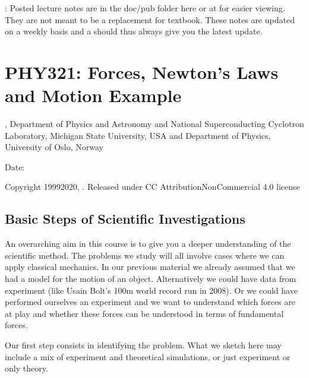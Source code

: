 \documentclass[letterpaper,10pt,english]{sphinxmanual}
\begin{document}
:
Posted lecture notes are in the doc/pub folder here or at  for easier viewing. They are not meant to be a replacement for textbook. These notes are updated on a weekly basis and a  should thus always give you the latest update.




\section{PHY321: Forces, Newton’s Laws and Motion Example}
\label{\detokenize{chapter2:phy321-forces-newton-s-laws-and-motion-example}}\label{\detokenize{chapter2::doc}}




, Department of Physics and Astronomy and National Superconducting Cyclotron Laboratory, Michigan State University, USA and Department of Physics, University of Oslo, Norway









Date: 

Copyright 1999\sphinxhyphen{}2020, . Released under CC Attribution\sphinxhyphen{}NonCommercial 4.0 license


\subsection{Basic Steps of Scientific Investigations}
\label{\detokenize{chapter2:basic-steps-of-scientific-investigations}}
An overarching aim in this course is to give you a deeper
understanding of the scientific method. The problems we study will all
involve cases where we can apply classical mechanics. In our previous
material we already assumed that we had a model for the motion of an
object.  Alternatively we could have data from experiment (like Usain
Bolt’s 100m world record run in 2008).  Or we could have performed
ourselves an experiment and we want to understand which forces are at
play and whether these forces can be understood in terms of
fundamental forces.

Our first step consists in identifying the problem. What we sketch
here may include a mix of experiment and theoretical simulations, or
just experiment or only theory.
\end{document}

